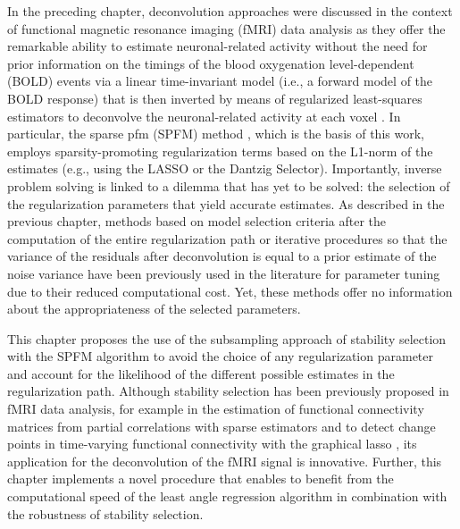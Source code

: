 In the preceding chapter, deconvolution approaches were discussed in the context
of functional magnetic resonance imaging (fMRI) data analysis as they offer the
remarkable ability to estimate neuronal-related activity without the need for
prior information on the timings of the blood oxygenation level-dependent (BOLD)
events via a linear time-invariant model (i.e., a forward model of the BOLD
response) that is then inverted by means of regularized least-squares estimators
to deconvolve the neuronal-related activity at each voxel
\citep{Gitelman2003Modelingregionalpsychophysiologic,Khalidov2011ActiveletsWaveletssparse,Karahanoglu2013TotalactivationfMRI,HernandezGarcia2011Neuronaleventdetection,Gaudes2010Detectioncharacterizationsingle,Gaudes2013Paradigmfreemapping}.
In particular, the sparse \acrlong*{pfm} (SPFM) method
\citep{Gaudes2013Paradigmfreemapping}, which is the basis of this work, employs
sparsity-promoting regularization terms based on the L1-norm of the estimates
(e.g., using the LASSO or the Dantzig Selector). Importantly, inverse problem
solving is linked to a dilemma that has yet to be solved: the selection of the
regularization parameters that yield accurate estimates. As described in the
previous chapter,  methods based on model selection criteria after the
computation of the entire regularization path
\citep{Gaudes2013Paradigmfreemapping} or iterative procedures so that the
variance of the residuals after deconvolution is equal to a prior estimate of
the noise variance \citep{Karahanoglu2013TotalactivationfMRI} have been
previously used in the literature for parameter tuning due to their reduced
computational cost. Yet, these methods offer no information about the
appropriateness of the selected parameters.

This chapter proposes the use of the subsampling approach of stability selection
\citep{Meinshausen2010Stabilityselection} with the SPFM algorithm
\citep{Gaudes2013Paradigmfreemapping} to avoid the choice of any regularization
parameter and account for the likelihood of the different possible estimates in
the regularization path. Although stability selection has been previously
proposed in fMRI data analysis, for example in the estimation of functional
connectivity matrices from partial correlations with sparse estimators
\citep{Ryali2012Estimationfunctionalconnectivity} and to detect change points in
time-varying functional connectivity with the graphical lasso
\citep{Cribben2013Detectingfunctionalconnectivity}, its application for the
deconvolution of the fMRI signal is innovative. Further, this chapter implements
a novel procedure that enables to benefit from the computational speed of the
least angle regression algorithm \citep{Efron2004Leastangleregression} in
combination with the robustness of stability selection. 

